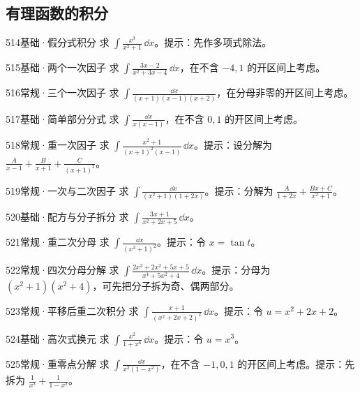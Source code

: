 \subsection{有理函数的积分}
\begin{exercise}{514}{基础·假分式积分}
求 $\int\frac{x^3}{x^2+1}\,\dd x$。提示：先作多项式除法。
\end{exercise}
\begin{exercise}{515}{基础·两个一次因子}
求 $\int\frac{3x-2}{x^2+3x-4}\,\dd x$，在不含 $-4,1$ 的开区间上考虑。
\end{exercise}
\begin{exercise}{516}{常规·三个一次因子}
求 $\int\frac{\dd x}{(x+1)(x-1)(x+2)}$，在分母非零的开区间上考虑。
\end{exercise}
\begin{exercise}{517}{基础·简单部分分式}
求 $\int\frac{\dd x}{x(x-1)}$，在不含 $0,1$ 的开区间上考虑。
\end{exercise}
\begin{exercise}{518}{常规·重一次因子}
求 $\int\frac{x^2+1}{(x+1)^2(x-1)}\,\dd x$。提示：设分解为 $\frac{A}{x-1}+\frac{B}{x+1}+\frac{C}{(x+1)^2}$。
\end{exercise}
\begin{exercise}{519}{常规·一次与二次因子}
求 $\int\frac{\dd x}{(x^2+1)(1+2x)}$。提示：分解为 $\frac{A}{1+2x}+\frac{Bx+C}{x^2+1}$。
\end{exercise}
\begin{exercise}{520}{基础·配方与分子拆分}
求 $\int\frac{3x+1}{x^2+2x+5}\,\dd x$。
\end{exercise}
\begin{exercise}{521}{常规·重二次分母}
求 $\int\frac{\dd x}{(x^2+1)^2}$。提示：令 $x=\tan t$。
\end{exercise}
\begin{exercise}{522}{常规·四次分母分解}
求 $\int\frac{2x^3+2x^2+5x+5}{x^4+5x^2+4}\,\dd x$。提示：分母为 $(x^2+1)(x^2+4)$，可先把分子拆为奇、偶两部分。
\end{exercise}
\begin{exercise}{523}{常规·平移后重二次积分}
求 $\int\frac{x+1}{(x^2+2x+2)^2}\,\dd x$。提示：令 $u=x^2+2x+2$。
\end{exercise}
\begin{exercise}{524}{基础·高次式换元}
求 $\int\frac{x^2}{1+x^6}\,\dd x$。提示：令 $u=x^3$。
\end{exercise}
\begin{exercise}{525}{常规·重零点分解}
求 $\int\frac{\dd x}{x^2(1-x^2)}$，在不含 $-1,0,1$ 的开区间上考虑。提示：先拆为 $\frac{1}{x^2}+\frac{1}{1-x^2}$。
\end{exercise}
